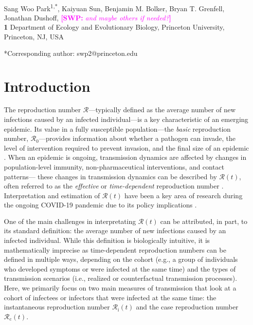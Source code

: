 \documentclass[12pt]{article}
\date{\today}
\newcommand{\comment}{\showcomment}
\newcommand{\showcomment}[3]{\textcolor{#1}{\textbf{[#2: }\textsl{#3}\textbf{]}}}
\newcommand{\swp}[1]{\comment{magenta}{SWP}{#1}}
\newcommand{\Rx}[1]{\ensuremath{{\mathcal R}_{#1}}\xspace}
\newcommand{\Ro}{\Rx{0}}
\newcommand{\Rc}{\Rx{\mathrm{c}}}
\newcommand{\Ri}{\Rx{\mathrm{i}}}
\newcommand{\RR}{\ensuremath{{\mathcal R}}\xspace}
\begin{document}
\begin{flushleft}{
	\Large
	\textbf{}
}
\newline
\\
Sang Woo Park\textsuperscript{1,*}, Kaiyuan Sun, Benjamin M. Bolker, Bryan T. Grenfell, Jonathan Dushoff, \swp{and maybe others if needed?}
\\
\bigskip
\textbf{1} Department of Ecology and Evolutionary Biology, Princeton University, Princeton, NJ, USA
\\
\bigskip

*Corresponding author: swp2@princeton.edu
\end{flushleft}

\section{Introduction}

The reproduction number \RR---typically defined as the average number of new infections caused by an infected individual---is a key characteristic of an emerging epidemic.
Its value in a fully susceptible population---the \emph{basic} reproduction number, \Ro---provides information about whether a pathogen can invade, the level of intervention required to prevent invasion, and the final size of an epidemic \citep{diekmann1990definition,anderson1991infectious}.
When an epidemic is ongoing, transmission dynamics are affected by changes in population-level immunity, non-pharmaceutical interventions, and contact patterns---
these changes in transmission dynamics can be described by $\RR(t)$, often referred to as the \emph{effective} or \emph{time-dependent} reproduction number \citep{wallinga2004different, fraser2007estimating, cori2013new}.
Interpretation and estimation of $\RR(t)$ have been a key area of research during the ongoing COVID-19 pandemic due to its policy implications \citep{pan2020association,flaxman2020estimating,gostic2020practical}.

One of the main challenges in interpretating $\RR(t)$ can be attributed, in part, to its standard definition: the average number of new infections caused by an infected individual.
While this definition is biologically intuitive, it is mathematically imprecise as time-dependent reproduction numbers can be defined in multiple ways, depending on the cohort (e.g., a group of individuals who developed symptoms or were infected at the same time) and the types of transmission scenarios (i.e., realized or counterfactual transmission processes).
Here, we primarily focus on two main measures of transmission that look at a cohort of infectees or infectors that were infected at the same time: the instantaneous reproduction number $\Ri(t)$ and the case reproduction number $\Rc(t)$.
\end{document}
